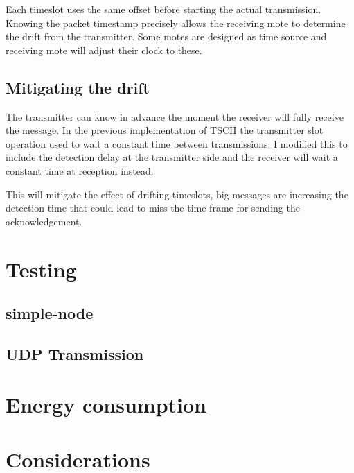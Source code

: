 Each timeslot uses the same offset before starting the actual transmission.
Knowing the packet timestamp precisely allows the receiving mote to determine the
drift from the transmitter. Some motes are designed as time source and
receiving mote will adjust their clock to these.

\subsection{Mitigating the drift}

The transmitter can know in advance the moment the receiver will fully
receive the message. In the previous implementation of TSCH the transmitter
slot operation used to wait a constant time between transmissions. I modified
this to include the detection delay at the transmitter side and the receiver
will wait a constant time at reception instead.

This will mitigate the effect of drifting timeslots, big messages are increasing
the detection time that could lead to miss the time frame for sending the
acknowledgement.

\section{Testing}

\subsection{simple-node}

\subsection{UDP Transmission}



\section{Energy consumption}

\section{Considerations}
